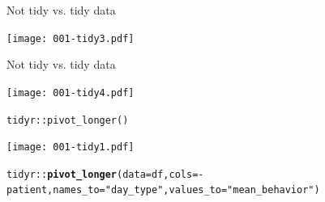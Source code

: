 \documentclass[10pt,handout]{beamer}\usepackage[]{graphicx}\usepackage[]{color}
\makeatletter
\newcommand{\hlstr}[1]{\textcolor[rgb]{0.192,0.494,0.8}{#1}}%
\newcommand{\hlopt}[1]{\textcolor[rgb]{0,0,0}{#1}}%
\newcommand{\hlstd}[1]{\textcolor[rgb]{0.345,0.345,0.345}{#1}}%
\newcommand{\hlkwc}[1]{\textcolor[rgb]{0.333,0.667,0.333}{#1}}%
\newcommand{\hlkwd}[1]{\textcolor[rgb]{0.737,0.353,0.396}{\textbf{#1}}}%
\newenvironment{kframe}{%
 \def\at@end@of@kframe{}%
 \ifinner\ifhmode%
  \def\at@end@of@kframe{\end{minipage}}%
  \begin{minipage}{\columnwidth}%
 \fi\fi%
 \def\FrameCommand##1{\hskip\@totalleftmargin \hskip-\fboxsep
 \colorbox{shadecolor}{##1}\hskip-\fboxsep
     \hskip-\linewidth \hskip-\@totalleftmargin \hskip\columnwidth}%
 \MakeFramed {\advance\hsize-\width
   \@totalleftmargin\z@ \linewidth\hsize
   \@setminipage}}%
 {\par\unskip\endMakeFramed%
 \at@end@of@kframe}
\newenvironment{knitrout}{}{} %
\makeatother
\begin{document}
\begin{frame}[fragile]{Not tidy vs. tidy data}
	
	
	
	\texttt{[image: 001-tidy3.pdf]}
	
	
	
\end{frame}

\begin{frame}[fragile]{Not tidy vs. tidy data}
	
	
	
	\texttt{[image: 001-tidy4.pdf]}
	
	
	
\end{frame}


\begin{frame}[fragile]{\texttt{tidyr::pivot\_longer()}}
	
	
	
	\texttt{[image: 001-tidy1.pdf]}
	
	
\begin{knitrout}\tiny
{}\color{fgcolor}\begin{kframe}
\begin{alltt}
\hlstd{tidyr}\hlopt{::}\hlkwd{pivot_longer}\hlstd{(}\hlkwc{data} \hlstd{= df,} \hlkwc{cols} \hlstd{=} \hlopt{-}\hlstd{patient,} \hlkwc{names_to} \hlstd{=} \hlstr{"day_type"}\hlstd{,} \hlkwc{values_to} \hlstd{=} \hlstr{"mean_behavior"}\hlstd{)}
\end{alltt}
\end{kframe}
\end{knitrout}
	
	
\end{frame}
\end{document}
